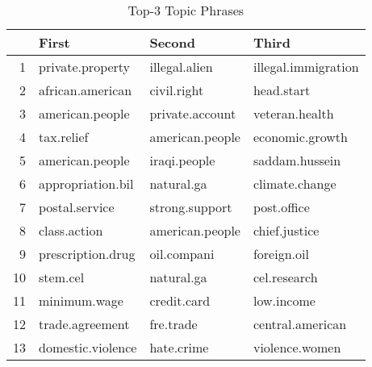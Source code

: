 \begin{table}[ht]
\centering
\begin{tabular}{rlll}
  \hline
 & First & Second & Third \\ 
  \hline
1 & private.property & illegal.alien & illegal.immigration \\ 
  2 & african.american & civil.right & head.start \\ 
  3 & american.people & private.account & veteran.health \\ 
  4 & tax.relief & american.people & economic.growth \\ 
  5 & american.people & iraqi.people & saddam.hussein \\ 
  6 & appropriation.bil & natural.ga & climate.change \\ 
  7 & postal.service & strong.support & post.office \\ 
  8 & class.action & american.people & chief.justice \\ 
  9 & prescription.drug & oil.compani & foreign.oil \\ 
  10 & stem.cel & natural.ga & cel.research \\ 
  11 & minimum.wage & credit.card & low.income \\ 
  12 & trade.agreement & fre.trade & central.american \\ 
  13 & domestic.violence & hate.crime & violence.women \\ 
   \hline
\end{tabular}
\caption{Top-3 Topic Phrases} 
\label{tab:tpcs3}
\end{table}
